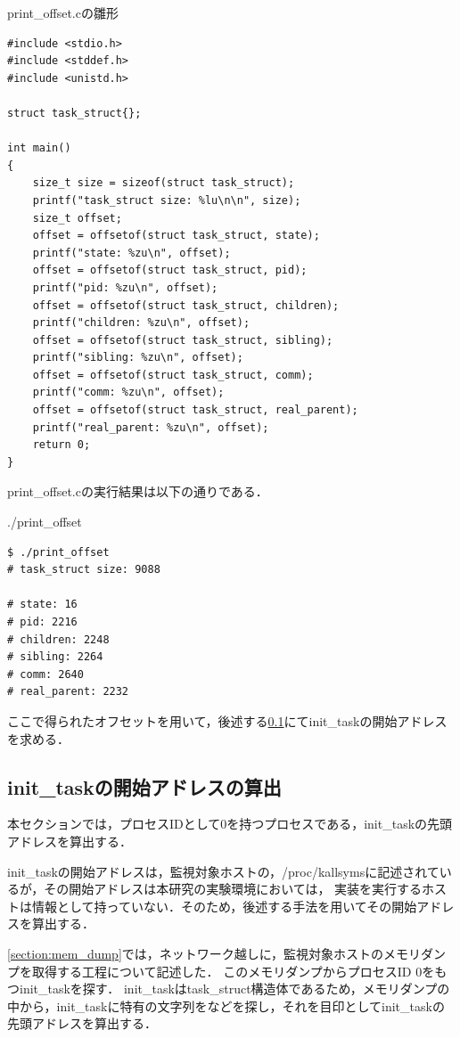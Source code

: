 \begin{itembox}[l]{print_offset.cの雛形}
    \begin{verbatim}
#include <stdio.h>
#include <stddef.h>
#include <unistd.h>

struct task_struct{};

int main()
{
    size_t size = sizeof(struct task_struct);
    printf("task_struct size: %lu\n\n", size);
    size_t offset;
    offset = offsetof(struct task_struct, state);
    printf("state: %zu\n", offset);
    offset = offsetof(struct task_struct, pid);
    printf("pid: %zu\n", offset);
    offset = offsetof(struct task_struct, children);
    printf("children: %zu\n", offset);
    offset = offsetof(struct task_struct, sibling);
    printf("sibling: %zu\n", offset);
    offset = offsetof(struct task_struct, comm);
    printf("comm: %zu\n", offset);
    offset = offsetof(struct task_struct, real_parent);
    printf("real_parent: %zu\n", offset);
    return 0;
}
    \end{verbatim}
\end{itembox}

print_offset.cの実行結果は以下の通りである．

\begin{itembox}[l]{./print_offset}
    \begin{verbatim}
$ ./print_offset
# task_struct size: 9088

# state: 16
# pid: 2216
# children: 2248
# sibling: 2264
# comm: 2640
# real_parent: 2232
    \end{verbatim}
\end{itembox}

ここで得られたオフセットを用いて，後述する\ref{subsection:find_init_task}にてinit_taskの開始アドレスを求める．

\subsection{init_taskの開始アドレスの算出}
\label{subsection:find_init_task}

本セクションでは，プロセスIDとして0を持つプロセスである，init_taskの先頭アドレスを算出する．

init_taskの開始アドレスは，監視対象ホストの，/proc/kallsymsに記述されているが，その開始アドレスは本研究の実験環境においては，
実装を実行するホストは情報として持っていない．そのため，後述する手法を用いてその開始アドレスを算出する．

\ref{section:mem_dump}では，ネットワーク越しに，監視対象ホストのメモリダンプを取得する工程について記述した．
このメモリダンプからプロセスID 0をもつinit_taskを探す．
init_taskはtask\_struct構造体であるため，メモリダンプの中から，init_taskに特有の文字列をなどを探し，それを目印としてinit_taskの先頭アドレスを算出する．

